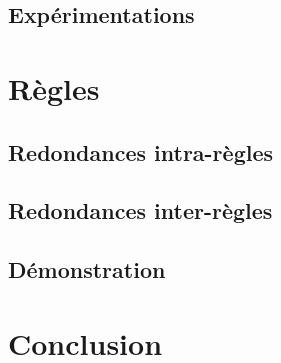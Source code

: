 \documentclass[utf8]{beamer}
\begin{document}
    \subsection{Expérimentations}
        
\section{Règles}
     
    \subsection{Redondances intra-règles}
    
    \subsection{Redondances inter-règles}
    
    \subsection{Démonstration}
        
\section{Conclusion}
    
\end{document}
